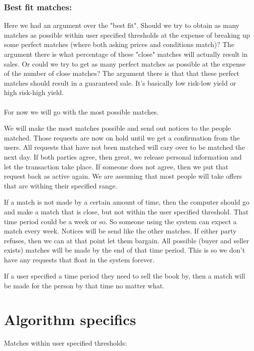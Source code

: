 \subsubsection{Best fit matches:}

Here we had an argument over the "best fit".  Should we try to obtain as many
matches as possible within user specified thresholds at the expense of breaking
up some perfect matches (where both asking prices and conditions match)?  The
argument there is what percentage of these "close" matches will actually result
in sales.  Or could we try to get as many perfect matches as possible at the expense of the
number of close matches?  The argument there is that that these perfect matches
should result in a guaranteed sale.
It's basically low risk-low yield or high risk-high yield.\\
\\
For now we will go with the most possible matches.

We will make the most matches possible and send out notices to the people
matched.  Those requests are now on hold until we get a confirmation from the
users.  All requests that have not been matched will cary over to be matched
the next day.  If both parties agree, then great, we release personal
information and let the transaction take place.  If someone does not agree,
then we put that request back as active again.  We are assuming that most
people will take offers that are withing their specified range.

If a match is not made by a certain amount of time, then the computer should go
and make a match that is close, but not within the user specified threshold.
That time period could be a week or so.  So someone using the system can expect
a match every week.  Notices will be send like the other matches.  If either
party refuses, then we can at that point let them bargain.  All possible (buyer
and seller exists) matches will be made by the end of that time period.  This
is so we don't have any requests that float in the system forever.

If a user specified a time period they need to sell the book by, then a match
will be made for the person by that time no matter what.


\section{Algorithm specifics}

Matches within user specified thresholds:

